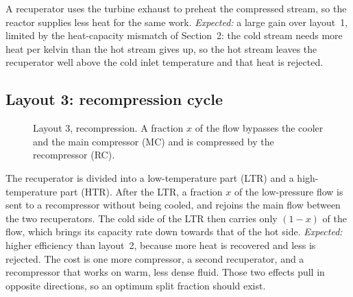 A recuperator uses the turbine exhaust to preheat the compressed stream, so the reactor supplies less heat for the same work. \emph{Expected:} a large gain over layout~1, limited by the heat-capacity mismatch of Section~2: the cold stream needs more heat per kelvin than the hot stream gives up, so the hot stream leaves the recuperator well above the cold inlet temperature and that heat is rejected.


\subsection{Layout 3: recompression cycle}
\begin{figure}[h]\centering
{}
\caption{Layout 3, recompression. A fraction $x$ of the flow bypasses the cooler and the main compressor (MC) and is compressed by the recompressor (RC).}\label{fig:l3}
\end{figure}

The recuperator is divided into a low-temperature part (LTR) and a high-temperature part (HTR). After the LTR, a fraction $x$ of the low-pressure flow is sent to a recompressor without being cooled, and rejoins the main flow between the two recuperators. The cold side of the LTR then carries only $(1-x)$ of the flow, which brings its capacity rate down towards that of the hot side. \emph{Expected:} higher efficiency than layout~2, because more heat is recovered and less is rejected. The cost is one more compressor, a second recuperator, and a recompressor that works on warm, less dense fluid. Those two effects pull in opposite directions, so an optimum split fraction should exist.

